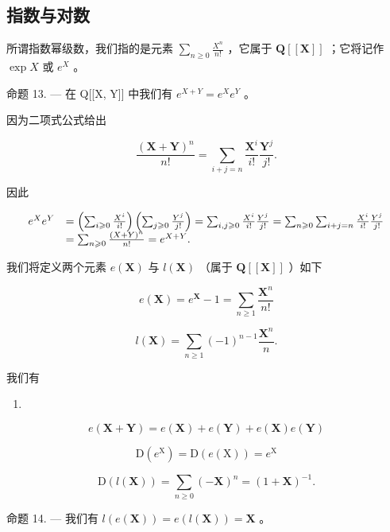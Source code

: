 \subsection{指数与对数}

所谓指数幂级数，我们指的是元素 \(\sum_{n\geqslant 0}\frac{X^n}{n!}\) ，它属于 \(\mathbf{Q}[[\mathbf{X}]]\) ；它将记作 \(\exp X\) 或 \(e^X\) 。

命题 13. --- 在 Q{[}{[}X, Y{]}{]} 中我们有 \(e^{X + Y} = e^X e^Y\) 。

因为二项式公式给出

\[
\frac {(\mathbf {X} + \mathbf {Y}) ^ {n}}{n !} = \sum_ {i + j = n} \frac {\mathbf {X} ^ {i}}{i !} \frac {\mathbf {Y} ^ {j}}{j !}.
\]

因此

\[
\begin{array}{r l} e ^ {X} e ^ {Y} & = \left(\sum_ {i \geqslant 0} \frac {X ^ {i}}{i !}\right) \left(\sum_ {j \geqslant 0} \frac {Y ^ {j}}{j !}\right) = \sum_ {i, j \geqslant 0} \frac {X ^ {i}}{i !} \frac {Y ^ {j}}{j !} = \sum_ {n \geqslant 0} \sum_ {i + j = n} \frac {X ^ {i}}{i !} \frac {Y ^ {j}}{j !} \\ & = \sum_ {n \geqslant 0} \frac {(X + Y) ^ {n}}{n !} = e ^ {X + Y}. \end{array}
\]

我们将定义两个元素 \(e(\mathbf{X})\) 与 \(l(\mathbf{X})\) （属于 \(\mathbf{Q}[[\mathbf{X}]]\) ）如下

\[
e (\mathbf {X}) = e ^ {\mathbf {X}} - 1 = \sum_ {n \geqslant 1} \frac {\mathbf {X} ^ {n}}{n !}\tag{33}
\]

\[
l (\mathbf {X}) = \sum_ {n \geqslant 1} (- 1) ^ {n - 1} \frac {\mathbf {X} ^ {n}}{n}.\tag{34}
\]

我们有

\begin{enumerate}
\def\labelenumi{(\arabic{enumi})}
\setcounter{enumi}{34}
\tightlist
\item
\end{enumerate}

\[
e (\mathbf {X} + \mathbf {Y}) = e (\mathbf {X}) + e (\mathbf {Y}) + e (\mathbf {X}) e (\mathbf {Y})
\]

\[
\mathrm{D} (e ^ {\mathrm{X}}) = \mathrm{D} (e (\mathrm{X})) = e ^ {\mathrm{X}}\tag{36}
\]

\[
\mathrm{D} (l (\mathbf {X})) = \sum_ {n \geqslant 0} (- \mathbf {X}) ^ {n} = (1 + \mathbf {X}) ^ {- 1}.\tag{37}
\]

命题 14. --- 我们有 \(l(e(\mathbf{X})) = e(l(\mathbf{X})) = \mathbf{X}\) 。

